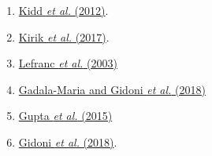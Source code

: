 \documentclass[11pt,]{article}
\providecommand{\tightlist}{%
  \setlength{\itemsep}{0pt}\setlength{\parskip}{0pt}}
\begin{document}
\begin{enumerate}
\def\labelenumi{\arabic{enumi}.}
\tightlist
\item
  \href{https://www.ncbi.nlm.nih.gov/pubmed/22205028}{Kidd \emph{et al.}
  (2012)}.
\item
  \href{https://www.ncbi.nlm.nih.gov/pubmed/28388445}{Kirik \emph{et
  al.} (2017)}.
\item
  \href{http://www.ncbi.nlm.nih.gov/pubmed/12477501}{Lefranc \emph{et
  al.} (2003)}
\item
  \href{https://doi.org/10.1101/405704}{Gadala-Maria and Gidoni \emph{et
  al.} (2018)}
\item
  \href{http://doi.org/10.1093/bioinformatics/btv359}{Gupta \emph{et
  al.} (2015)}\\
\item
  \href{https://doi.org/10.1101/314476}{Gidoni \emph{et al.} (2018)}.
\end{enumerate}
\end{document}
